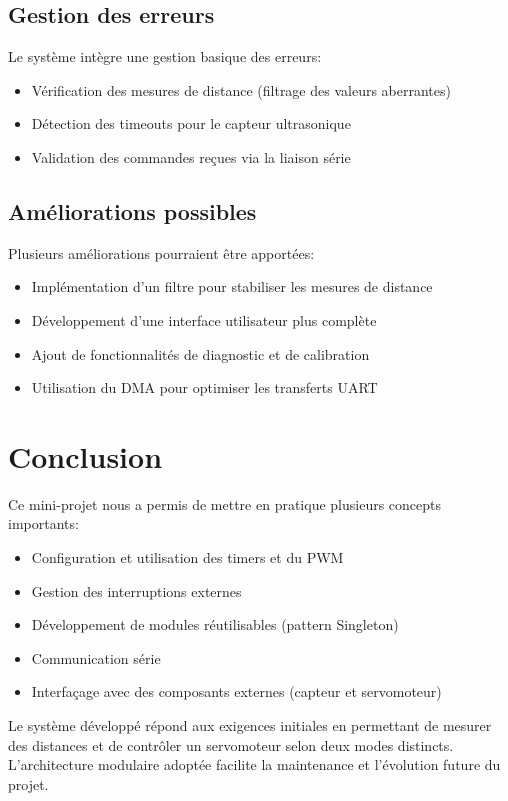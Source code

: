 \documentclass{article}
\begin{document}
\subsection{Gestion des erreurs}
Le système intègre une gestion basique des erreurs:
\begin{itemize}
    \item Vérification des mesures de distance (filtrage des valeurs aberrantes)
    \item Détection des timeouts pour le capteur ultrasonique
    \item Validation des commandes reçues via la liaison série
\end{itemize}

\subsection{Améliorations possibles}
Plusieurs améliorations pourraient être apportées:
\begin{itemize}
    \item Implémentation d'un filtre pour stabiliser les mesures de distance
    \item Développement d'une interface utilisateur plus complète
    \item Ajout de fonctionnalités de diagnostic et de calibration
    \item Utilisation du DMA pour optimiser les transferts UART
\end{itemize}

\section{Conclusion}
Ce mini-projet nous a permis de mettre en pratique plusieurs concepts importants:
\begin{itemize}
    \item Configuration et utilisation des timers et du PWM
    \item Gestion des interruptions externes
    \item Développement de modules réutilisables (pattern Singleton)
    \item Communication série
    \item Interfaçage avec des composants externes (capteur et servomoteur)
\end{itemize}

Le système développé répond aux exigences initiales en permettant de mesurer des distances et de contrôler un servomoteur selon deux modes distincts. L'architecture modulaire adoptée facilite la maintenance et l'évolution future du projet.
\end{document}
